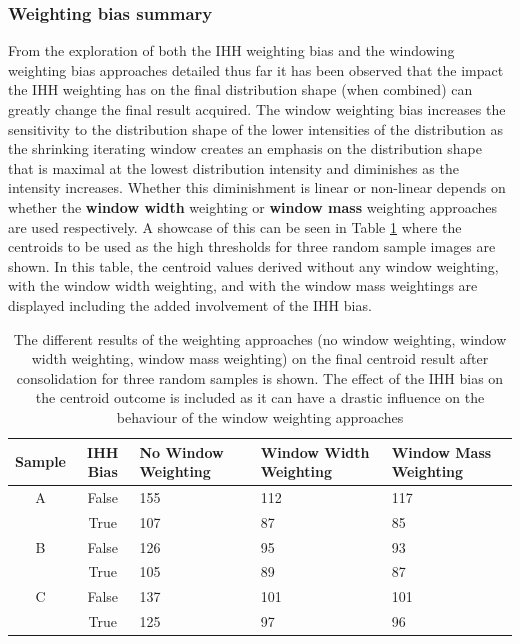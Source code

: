 \subsubsection*{Weighting bias summary}
From the exploration of both the IHH weighting bias and the windowing weighting bias approaches detailed thus far it has been observed that the impact the IHH weighting has on the final distribution shape (when combined) can greatly change the final result acquired. The window weighting bias increases the sensitivity to the distribution shape of the lower intensities of the distribution as the shrinking iterating window creates an emphasis on the distribution shape that is maximal at the lowest distribution intensity and diminishes as the intensity increases. Whether this diminishment is linear or non-linear depends on whether the \textbf{window width} weighting or \textbf{window mass} weighting approaches are used respectively. A showcase of this can be seen in Table \ref{tab:window_weighting} where the centroids to be used as the high thresholds for three random sample images are shown. In this table, the centroid values derived without any window weighting, with the window width weighting, and with the window mass weightings are displayed including the added involvement of the IHH bias.
\begin{table}
    \centering
    \begin{tabular}{|c|c|m{}|m{}|m{}|} \hline 
         \textbf{Sample}&  \textbf{IHH Bias}&  \textbf{No Window Weighting}&  \textbf{Window Width Weighting}& \textbf{Window Mass Weighting}\\ \hline 
         A&  False&  155&  112& 117\\ \hline 
         &  True&  107&  87& 85\\ \hline 
         B&  False&  126&  95& 93\\ \hline 
         &  True&  105&  89& 87\\ \hline 
         C&  False&  137&  101& 101\\ \hline 
         &  True&  125&  97& 96\\ \hline
    \end{tabular}
    \caption[Table depicting the effect of the different window weighting approaches on the centroid value for a limited subset of three samples]{The different results of the weighting approaches (no window weighting, window width weighting, window mass weighting) on the final centroid result after consolidation for three random samples is shown. The effect of the IHH bias on the centroid outcome is included as it can have a drastic influence on the behaviour of the window weighting approaches}
    \label{tab:window_weighting}
\end{table}
